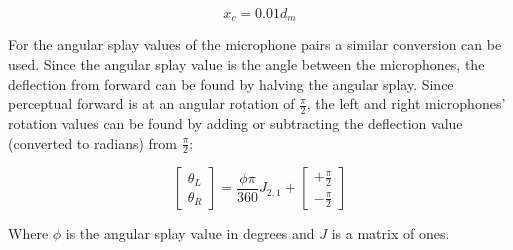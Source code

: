 \begin{equation}
x_c = 0.01d_m
\end{equation}

For the angular splay values of the microphone pairs a similar conversion can be used. Since the angular splay value is the angle between the microphones, the deflection from forward can be found by halving the angular splay. Since perceptual forward is at an angular rotation of $\frac{\pi}{2}$, the left and right microphones' rotation values can be found by adding or subtracting the deflection value (converted to radians) from $\frac{\pi}{2}$:

\begin{equation}
\begin{bmatrix} \theta_L \\ \theta_R \end{bmatrix} = \frac{\phi\pi}{360}J_{2,1} + \begin{bmatrix} +\frac{\pi}{2} \\ -\frac{\pi}{2} \end{bmatrix}
\end{equation}

Where $\phi$ is the angular splay value in degrees and $J$ is a matrix of ones.
